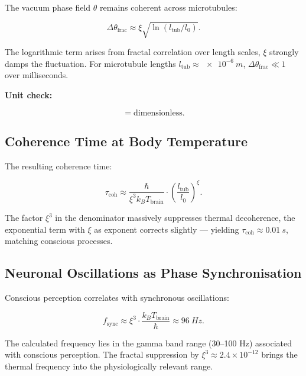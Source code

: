 	The vacuum phase field \(\theta\) remains coherent across microtubules:
	
	\begin{equation}
		\Delta \theta_{\text{frac}} \approx \xi \sqrt{\ln(l_{\text{tub}}/l_0)}.
	\end{equation}
	
	The logarithmic term arises from fractal correlation over length scales, \(\xi\) strongly damps the fluctuation. For microtubule lengths \(l_{\text{tub}} \approx \SI{e-6}{m}\), \(\Delta \theta_{\text{frac}} \ll 1\) over milliseconds.
	
	\textbf{Unit check:}
	
	\begin{equation}
		[\Delta \theta_{\text{frac}}] = \text{dimensionless}.
	\end{equation}
	
	\subsection*{Coherence Time at Body Temperature}
	
	The resulting coherence time:
	
	\begin{equation}
		\tau_{\text{coh}} \approx \frac{\hbar}{\xi^3 k_B T_{\text{brain}}} \cdot \left( \frac{l_{\text{tub}}}{l_0} \right)^{\xi}.
	\end{equation}
	
	The factor \(\xi^3\) in the denominator massively suppresses thermal decoherence, the exponential term with \(\xi\) as exponent corrects slightly — yielding \(\tau_{\text{coh}} \approx \SI{0.01}{s}\), matching conscious processes.
	
	\subsection*{Neuronal Oscillations as Phase Synchronisation}
	
	Conscious perception correlates with synchronous oscillations:
	
	\begin{equation}
		f_{\text{sync}} \approx \xi^{3} \cdot \frac{k_B T_{\text{brain}}}{\hbar} \approx \SI{96}{Hz}.
	\end{equation}
	
	The calculated frequency lies in the gamma band range (30--100 Hz) associated with conscious perception. The fractal suppression by \(\xi^3 \approx 2.4 \times 10^{-12}\) brings the thermal frequency into the physiologically relevant range.
	
